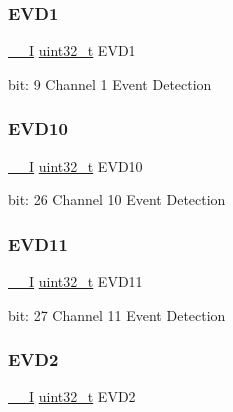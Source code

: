 \subsubsection{\texorpdfstring{EVD1}{EVD1}}
{\footnotesize\ttfamily \mbox{\hyperlink{core__cm0plus_8h_af63697ed9952cc71e1225efe205f6cd3}{\+\_\+\+\_\+I}} \mbox{\hyperlink{union_e_v_s_y_s___i_n_t_f_l_a_g___type_a7c2ec0f7b3f1314bdede58b182af397c}{uint32\+\_\+t}} E\+V\+D1}

bit\+: 9 Channel 1 Event Detection \mbox{\label{union_e_v_s_y_s___i_n_t_f_l_a_g___type_a62747260dfae53e2219d0238f2944511}} 
\subsubsection{\texorpdfstring{EVD10}{EVD10}}
{\footnotesize\ttfamily \mbox{\hyperlink{core__cm0plus_8h_af63697ed9952cc71e1225efe205f6cd3}{\+\_\+\+\_\+I}} \mbox{\hyperlink{union_e_v_s_y_s___i_n_t_f_l_a_g___type_a7c2ec0f7b3f1314bdede58b182af397c}{uint32\+\_\+t}} E\+V\+D10}

bit\+: 26 Channel 10 Event Detection \mbox{\label{union_e_v_s_y_s___i_n_t_f_l_a_g___type_aa9a076af33cb0bf70d7235920a2e7adc}} 
\subsubsection{\texorpdfstring{EVD11}{EVD11}}
{\footnotesize\ttfamily \mbox{\hyperlink{core__cm0plus_8h_af63697ed9952cc71e1225efe205f6cd3}{\+\_\+\+\_\+I}} \mbox{\hyperlink{union_e_v_s_y_s___i_n_t_f_l_a_g___type_a7c2ec0f7b3f1314bdede58b182af397c}{uint32\+\_\+t}} E\+V\+D11}

bit\+: 27 Channel 11 Event Detection \mbox{\label{union_e_v_s_y_s___i_n_t_f_l_a_g___type_a03d775ffb1ff832019b88855cb27cca2}} 
\subsubsection{\texorpdfstring{EVD2}{EVD2}}
{\footnotesize\ttfamily \mbox{\hyperlink{core__cm0plus_8h_af63697ed9952cc71e1225efe205f6cd3}{\+\_\+\+\_\+I}} \mbox{\hyperlink{union_e_v_s_y_s___i_n_t_f_l_a_g___type_a7c2ec0f7b3f1314bdede58b182af397c}{uint32\+\_\+t}} E\+V\+D2}

